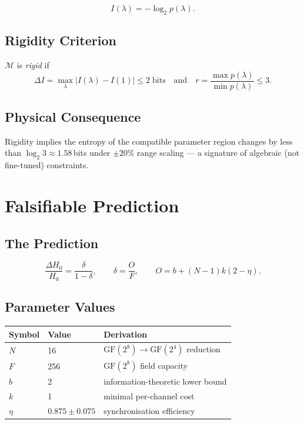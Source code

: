 \documentclass[12pt,a4paper]{article}
\newcommand{\calM}{\mathcal{M}}
\begin{document}
\begin{equation}
  I(\lambda) = -\log_2 p(\lambda).
  \label{eq:surprise}
\end{equation}

\subsection{Rigidity Criterion}

$\calM$ is \emph{rigid} if
\begin{equation}
  \Delta I = \max_\lambda|I(\lambda)-I(1)| \leq 2\;\text{bits}
  \quad\text{and}\quad
  r = \frac{\max p(\lambda)}{\min p(\lambda)} \leq 3.
  \label{eq:rigidity}
\end{equation}

\subsection{Physical Consequence}

Rigidity implies the entropy of the compatible parameter region changes by
less than $\log_2 3 \approx 1.58$\,bits under $\pm 20\%$ range scaling — a
signature of algebraic (not fine-tuned) constraints.

\section{Falsifiable Prediction}
\label{sec:prediction}

\subsection{The Prediction}

\begin{equation}
  \boxed{
    \frac{\Delta H_0}{H_0}
    = \frac{\delta}{1-\delta},
    \qquad
    \delta = \frac{O}{F},
    \qquad
    O = b + (N-1)k(2-\eta).
  }
  \label{eq:prediction}
\end{equation}

\subsection{Parameter Values}

\begin{center}
\begin{tabular}{lll}
\hline
\textbf{Symbol} & \textbf{Value} & \textbf{Derivation}\\
\hline
$N$ & 16 & $\mathrm{GF}(2^8)\to\mathrm{GF}(2^4)$ reduction\\
$F$ & 256 & $\mathrm{GF}(2^8)$ field capacity\\
$b$ & 2 & information-theoretic lower bound\\
$k$ & 1 & minimal per-channel cost\\
$\eta$ & $0.875\pm 0.075$ & synchronisation efficiency\\
\hline
\end{tabular}
\end{center}
\end{document}
